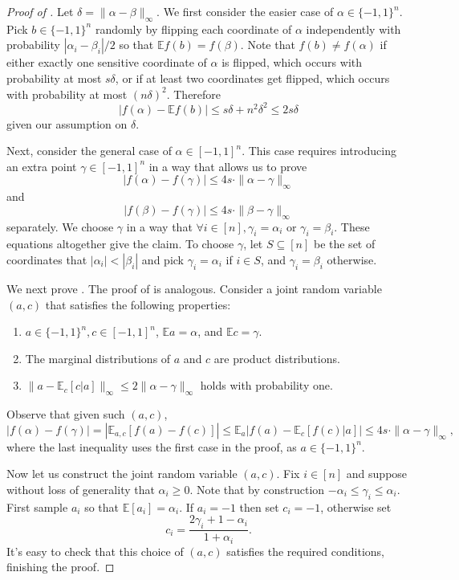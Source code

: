 \documentclass{toc}
\newcommand{\E}{\mathbb{E}}
\begin{document}
\begin{proof}[Proof of ]
Let $\delta=\|\alpha-\beta\|_{\infty}$.
We first consider the easier case of $\alpha\in \{-1,1\}^n$.
Pick $b\in\{-1,1\}^n$ randomly by flipping each coordinate of $\alpha$ independently with probability $|\alpha_i-\beta_i|/2$ so that $\E f(b) = f(\beta)$. Note that $f(b) \neq f(\alpha)$ if either exactly one sensitive coordinate of $\alpha$ is flipped, which occurs with probability at most $s \delta$, or if at least two coordinates get flipped, which occurs with probability at most $(n \delta)^2$. Therefore
$$
|f(\alpha) - \E f(b) | \leq s \delta + n^2 \delta^2 \leq 2s \delta
$$
given our assumption on $\delta$.

Next, consider the general case of $\alpha \in [-1,1]^n$.
This case requires introducing an extra point $\gamma\in [-1,1]^n$ in a way that allows us to prove
\begin{equation}
\label{equation:alpha}
|f(\alpha) - f(\gamma)| \leq 4s\cdot \|\alpha -\gamma\|_\infty
\end{equation}
and
\begin{equation}
\label{equation:beta}
|f(\beta) - f(\gamma)| \leq 4s\cdot \|\beta -\gamma\|_\infty
\end{equation}
separately.
We choose $\gamma$ in a way that $\forall i \in [n], \gamma_i = \alpha_i$ or $\gamma_i = \beta_i$. These equations altogether give the claim.
To choose $\gamma$, let $S\subseteq [n]$ be the set of coordinates that $|\alpha_i| < |\beta_i|$ and pick $\gamma_i = \alpha_i$ if $i\in S$, and $\gamma_i = \beta_i$ otherwise.

We next prove .  The proof of  is analogous. Consider a joint random variable $(a,c)$ that satisfies the following properties:
\begin{enumerate}
\item  $a\in\{-1,1\}^n, c\in[-1,1]^n$, $\E a = \alpha$, and $\E c = \gamma$.
\item The marginal distributions of $a$ and $c$ are product distributions.
\item $\|a - \E_c[  c|a]\|_\infty \leq 2 \|\alpha-\gamma\|_\infty$ holds with probability one.
\end{enumerate}

Observe that given such $(a,c)$,
$$
|f(\alpha) - f(\gamma)| = |\E_{a,c} [f(a) - f(c)]| \le \E_{a} \left|f(a) - \E_c[f(c)|a] \right|\leq 4s\cdot \|\alpha -\gamma\|_\infty,
$$
where the last inequality uses the first case in the proof, as $a \in \{-1,1\}^n$.

Now let us construct the joint random variable $(a,c)$.
Fix  $i\in[n]$ and suppose without loss of generality that $\alpha_i \ge 0$.
Note that by construction $-\alpha_i \le \gamma_i \leq \alpha_i$. First sample $a_i$ so that $\E[a_i]=\alpha_i$.
If $a_i = -1$ then set $c_i=-1$, otherwise set
\[
  c_i = \frac{2\gamma_i + 1-\alpha_i}{1+\alpha_i}.
\]
It's easy to check that this choice of $(a,c)$ satisfies the required
conditions, finishing the proof.
\end{proof}
\end{document}

